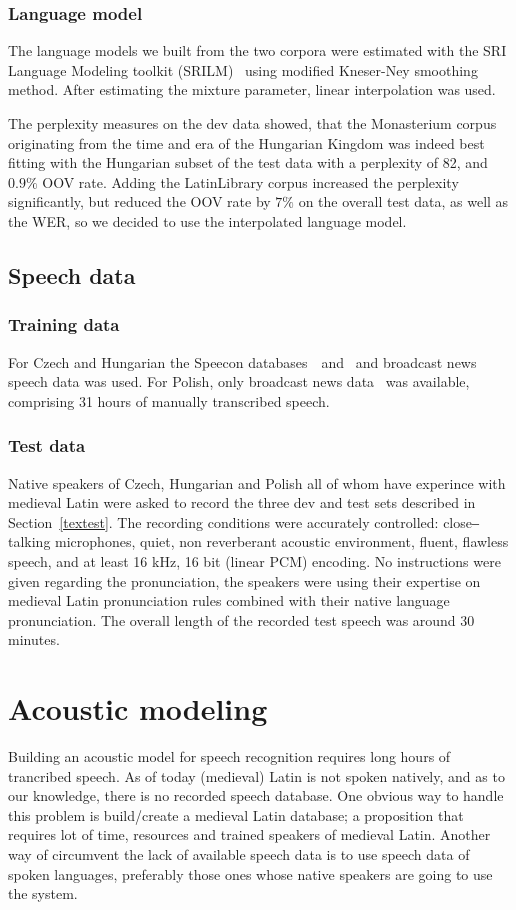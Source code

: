 \documentclass[runningheads,a4paper]{llncs}
\begin{document}
\subsubsection{Language model}
The language models we built from the two corpora were estimated with the SRI Language Modeling toolkit (SRILM)~\cite{srilm} using modified Kneser-Ney smoothing method.
After estimating the mixture parameter, linear interpolation was used.

The perplexity measures on the dev data showed, that the Monasterium corpus originating from the time and era of the Hungarian Kingdom was indeed best fitting with the Hungarian subset of the test data with a perplexity of 82, and $0.9\%$ OOV rate.
Adding the LatinLibrary corpus increased the perplexity significantly, but reduced the OOV rate by $7\%$ on the overall test data, as well as the WER, so we decided to use the interpolated language model.

\subsection{Speech data}
\subsubsection{Training data}
For Czech and Hungarian the Speecon databases~\cite{czech}~and~\cite{hungarian} and broadcast news speech data was used.
For Polish, only broadcast news data~\cite{polish} was available, comprising 31 hours of manually transcribed speech.
\subsubsection{Test data}
Native speakers of Czech, Hungarian and Polish all of whom have experince with medieval Latin were asked to record the three dev and test sets described in Section~\ref{textest}.
The recording conditions were accurately controlled: close‒talking microphones, quiet, non reverberant acoustic environment, fluent, flawless speech, and at least 16 kHz, 16 bit (linear PCM) encoding.
No instructions were given regarding the pronunciation, the speakers were using their expertise on medieval Latin pronunciation rules combined with their native language pronunciation.
The overall length of the recorded test speech was around 30 minutes.

\section{Acoustic modeling}\label{AM}
Building an acoustic model for speech recognition requires long hours of trancribed speech.
As of today (medieval) Latin is not spoken natively, and as to our knowledge, there is no recorded speech database.
One obvious way to handle this problem is build/create a medieval Latin database; a proposition that requires lot of time, resources and trained speakers of medieval Latin. 
Another way of circumvent the lack of available speech data is to use speech data of spoken languages, preferably those ones whose native speakers are going to use the system. 
\end{document}
